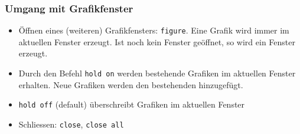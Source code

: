 % 
% 
\begin{frame}[fragile]\frametitle{Umgang mit Grafikfenster}
\begin{itemize}
\item Öffnen eines (weiteren) Grafikfensters: \lstinline!figure!.  Eine
  Grafik wird immer im aktuellen Fenster erzeugt. Ist noch kein
  Fenster geöffnet, so wird ein Fenster erzeugt.
\item Durch den Befehl \lstinline!hold on! werden bestehende Grafiken im
  aktuellen Fenster erhalten. Neue Grafiken werden den bestehenden
  hinzugefügt. 
\item \lstinline!hold off! (default) überschreibt Grafiken im
  aktuellen Fenster
\item Schliessen: \lstinline!close!, \lstinline!close all!
\end{itemize}
\end{frame}

